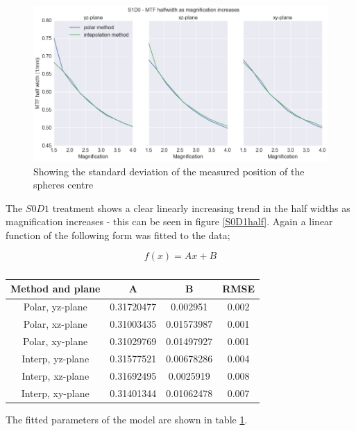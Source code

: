 \documentclass[
  twoside,
  11pt, a4paper,
  footinclude=true,
  headinclude=true,
  cleardoublepage=empty
]{scrbook}
\begin{document}
\begin{figure}[h!]
  \centering
    \includegraphics[width=\textwidth]{figures/S1D0half.png}
    \caption{Showing the standard deviation of the measured position of the spheres centre}
        \label{S1D0half}
\end{figure}

The $S0D1$ treatment shows a clear linearly increasing trend in the half widths as magnification increases - this can be seen in figure \ref{S0D1half}. Again a linear function of the following form was fitted to the data;

\[
f(x) = Ax + B
\]


\begin{table}
\caption{}
\label{linhalffit}
\begin{tabular}{c|ccc}
\toprule
{} Method and plane &     A &     B &  RMSE\\
\midrule
Polar, yz-plane         &  0.31720477 & 0.002951    & 0.002\\
Polar, xz-plane        &  0.31003435 & 0.01573987 &  0.001\\
Polar, xy-plane      &  0.31029769 & 0.01497927 &  0.001\\
Interp, yz-plane       &  0.31577521 & 0.00678286 &  0.004\\
Interp, xz-plane       &  0.31692495 & 0.0025919 &  0.008\\
Interp, xy-plane       &  0.31401344 & 0.01062478 &  0.007\\
\bottomrule
\end{tabular}
\end{table}

The fitted parameters of the model are shown in table \ref{linhalffit}.
\end{document}
